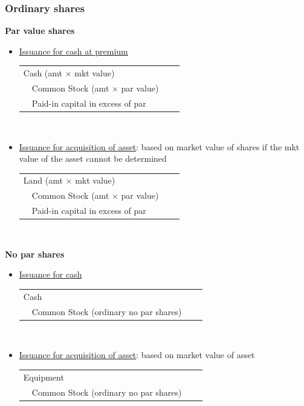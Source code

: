 \documentclass{article}
\begin{document}
\begin{multicols}{2}
\subsubsection{Ordinary shares}
\textbf{Par value shares}
\begin{itemize}
	\item \underline{Issuance for cash at premium} \vspace{0.5em}\\
	\begin{tabular}{llll}
		\multicolumn{4}{l}{Cash (amt $\times$ mkt value)}\\
		& Common Stock (amt $\times$ par value)& &\\
		& Paid-in capital in excess of par& &
	\end{tabular}\vspace{0.5em}\\
\item \underline{Issuance for acquisition of asset}: based on market value of shares if the mkt value of the asset cannot be determined \vspace{0.5em}\\
\begin{tabular}{llll}
	\multicolumn{4}{l}{Land (amt $\times$ mkt value)}\\
	& Common Stock (amt $\times$ par value)& &\\
	& Paid-in capital in excess of par& &
\end{tabular}\vspace{0.5em}\\
\end{itemize}
\textbf{No par shares}
\begin{itemize}
	\item \underline{Issuance for cash} \vspace{0.5em}\\
	\begin{tabular}{llll}
		\multicolumn{4}{l}{Cash }\\
		& Common Stock (ordinary no par shares)& &
	\end{tabular}\vspace{0.5em}\\
	\item \underline{Issuance for acquisition of asset}: based on market value of asset \vspace{0.5em}\\
	\begin{tabular}{llll}
		\multicolumn{4}{l}{Equipment}\\
		& Common Stock (ordinary no par shares)& &

\end{tabular}
\end{itemize}
\end{multicols}
\end{document}
